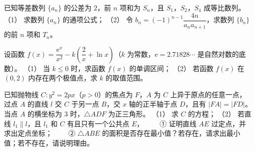 \begin{question}
已知等差数列 $\{a_n\}$ 的公差为 $2$，前 $n$ 项和为 $S_n$，且 $S_1$，$S_2$，$S_4$ 成等比数列。
（1） 求数列 $\{a_n\}$ 的通项公式；
（2） 令 $b_n=(-1)^{n-1}\dfrac{4n}{a_na_{n+1}}$，求数列 $\{b_n\}$ 的前 $n$ 项和 $T_n$。
\end{question}
\begin{question}
设函数 $f(x)=\dfrac{\mathrm e^x}{x^2}-k\left(\dfrac2x+\ln x\right)$（$k$ 为常数，$\mathrm e=2.71828\cdots$ 是自然对数的底数）。
（1） 当 $k\leqslant0$ 时，求函数 $f(x)$ 的单调区间；
（2） 若函数 $f(x)$ 在 $(0,2)$ 内存在两个极值点，求 $k$ 的取值范围。
\end{question}
\begin{question}
已知抛物线 $C:y^2=2px$（$p>0$）的焦点为 $F$，$A$ 为 $C$ 上异于原点的任意一点，过点 $A$ 的直线 $l$ 交 $C$ 于另一点 $B$，交 $x$ 轴的正半轴于点 $D$，且有 $|FA|=|FD|$。当点 $A$ 的横坐标为 $3$ 时，$\triangle ADF$ 为正三角形。
（1） 求 $C$ 的方程；
（2） 若直线 $l_1\parallel l$，且 $l_1$ 和 $C$ 有且只有一个公共点 $E$，
　　① 证明直线 $AE$ 过定点，并求出定点坐标；
　　② $\triangle ABE$ 的面积是否存在最小值？若存在，请求出最小值；若不存在，请说明理由。

\end{question}